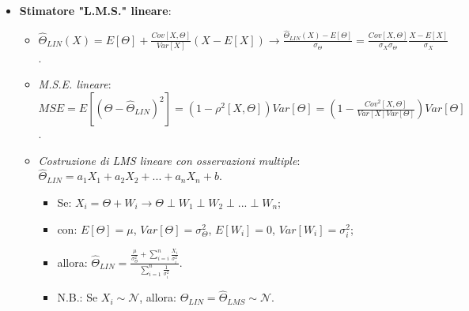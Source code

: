 \documentclass[8pt]{extarticle}
\begin{document}
\begin{multicols*}{3}
\begin{itemize}
\begin{itemize}
\begin{itemize}
                        \end{itemize}
              \end{itemize}
        \item \textbf{Stimatore "L.M.S." lineare}:
              \begin{itemize}
                  \item $\hat{\Theta}_{LIN}(X)=E[\Theta]+\frac{Cov[X, \Theta]}{Var[X]}(X-E[X])\rightarrow\frac{\hat{\Theta}_{LIN}(X)-E[\Theta]}{\sigma_{\Theta}}=\frac{Cov[X,\Theta]}{\sigma_{X}\sigma_{\Theta}}\frac{X-E[X]}{\sigma_{X}}$.
                  \item \textit{M.S.E. lineare}: $MSE=E[(\Theta-\hat{\Theta}_{LIN})^2]=(1-\rho^{2}[X,\Theta])Var[\Theta]=(1-\frac{Cov^{2}[X,\Theta]}{Var[X]Var[\Theta]})Var[\Theta]$.
                  \item \textit{Costruzione di LMS lineare con osservazioni multiple}: $\hat{\Theta}_{LIN}=a_{1}X_{1}+a_{2}X_{2}+...+a_{n}X_{n}+b$.
                        \begin{itemize}
                            \item Se: $X_{i}=\Theta + W_{i}\rightarrow \Theta\perp W_{1}\perp W_{2}\perp ...\perp W_{n}$;
                            \item con: $E[\Theta]=\mu$, $Var[\Theta]=\sigma^{2}_{\Theta}$, $E[W_{i}]=0$, $Var[W_{i}]=\sigma^{2}_{i}$;
                            \item allora: $\hat{\Theta}_{LIN}=\frac{\frac{\mu}{\sigma^{2}_{\Theta}}+\sum_{i=i}^{n}\frac{X_{i}}{\sigma^{2}_{i}}}{\sum_{i=1}^{n}\frac{1}{\sigma^{2}_{i}}}$.
                            \item N.B.: Se $X_{i}\sim\mathcal{N}$, allora: $\hat{\Theta}_{LIN}=\hat{\Theta}_{LMS}\sim\mathcal{N}$.
                        \end{itemize}
              \end{itemize}
    \end{itemize}


\end{multicols*}
\end{document}
